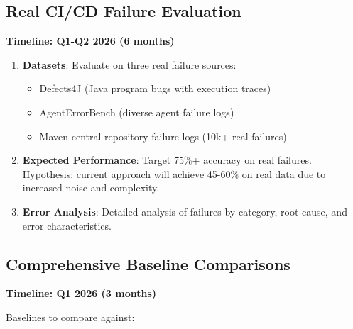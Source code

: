 \documentclass[11pt]{article}
\begin{document}
\subsection{Real CI/CD Failure Evaluation}

\textbf{Timeline: Q1-Q2 2026 (6 months)}

\begin{enumerate}
    \item \textbf{Datasets}: Evaluate on three real failure sources:
    \begin{itemize}
        \item Defects4J (Java program bugs with execution traces)
        \item AgentErrorBench (diverse agent failure logs)
        \item Maven central repository failure logs (10k+ real failures)
    \end{itemize}

    \item \textbf{Expected Performance}: Target 75\%+ accuracy on real failures. Hypothesis: current approach will achieve 45-60\% on real data due to increased noise and complexity.

    \item \textbf{Error Analysis}: Detailed analysis of failures by category, root cause, and error characteristics.
\end{enumerate}

\subsection{Comprehensive Baseline Comparisons}

\textbf{Timeline: Q1 2026 (3 months)}

Baselines to compare against:
\end{document}
